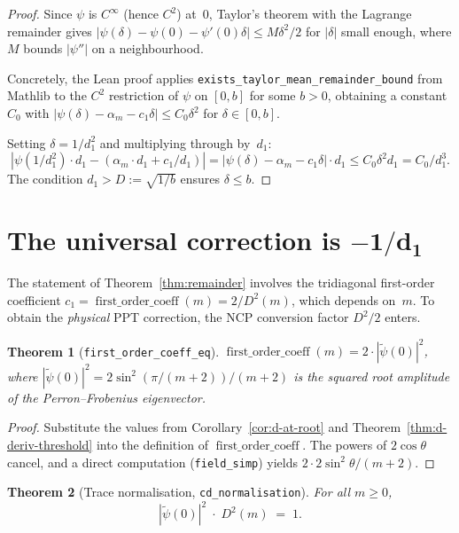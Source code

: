 \documentclass[11pt,a4paper]{article}
\theoremstyle{plain}
\newtheorem{theorem}{Theorem}[section]
\theoremstyle{definition}
\newcommand{\Dsq}{D^2}
\newcommand{\alpham}{\alpha_m}
\newcommand{\lean}[1]{\texttt{#1}}
\begin{document}
\begin{proof}
Since $\psi$ is $C^\infty$ (hence $C^2$) at~$0$, Taylor's theorem with
the Lagrange remainder gives
$|\psi(\delta) - \psi(0) - \psi'(0)\delta| \le M\delta^2/2$
for $|\delta|$ small enough, where $M$ bounds $|\psi''|$ on a
neighbourhood.

Concretely, the Lean proof applies
\lean{exists\_taylor\_mean\_remainder\_bound} from Mathlib
to the $C^2$ restriction of $\psi$ on $[0, b]$ for some $b > 0$,
obtaining a constant $C_0$ with
$|\psi(\delta) - \alpham - c_1 \delta| \le C_0 \delta^2$
for $\delta \in [0,b]$.

Setting $\delta = 1/d_1^2$ and multiplying through by~$d_1$:
\[
  |\psi(1/d_1^2) \cdot d_1 - (\alpham \cdot d_1 + c_1/d_1)|
  = |\psi(\delta) - \alpham - c_1\delta| \cdot d_1
  \le C_0 \delta^2 d_1 = C_0 / d_1^3.
\]
The condition $d_1 > D := \sqrt{1/b}$ ensures $\delta \le b$.
\end{proof}

\section{The universal correction is $\boldsymbol{-1/d_1}$}
\label{sec:universal}

The statement of Theorem~\ref{thm:remainder} involves the
tridiagonal first-order coefficient
$c_1 = \operatorname{first\_order\_coeff}(m) = 2/\Dsq(m)$,
which depends on~$m$.  To obtain the \emph{physical}
PPT correction, the NCP conversion factor $\Dsq/2$ enters.

\begin{theorem}[\lean{first\_order\_coeff\_eq}]
\label{thm:coeff-eq}
$\operatorname{first\_order\_coeff}(m) = 2 \cdot |\tilde\psi(0)|^2$,
where $|\tilde\psi(0)|^2 = 2\sin^2(\pi/(m{+}2))/(m{+}2)$ is the
squared root amplitude of the Perron--Frobenius eigenvector.
\end{theorem}

\begin{proof}
Substitute the values from Corollary~\ref{cor:d-at-root}
and Theorem~\ref{thm:d-deriv-threshold} into the definition
of $\operatorname{first\_order\_coeff}$.  The powers of
$2\cos\theta$ cancel, and a direct computation (\lean{field\_simp})
yields $2 \cdot 2\sin^2\theta/(m{+}2)$.
\end{proof}

\begin{theorem}[Trace normalisation, \lean{cd\_normalisation}]
\label{thm:trace-norm}
For all $m \ge 0$,
\[
  |\tilde\psi(0)|^2 \;\cdot\; \Dsq(m) \;=\; 1.
\]
\end{theorem}
\end{document}
